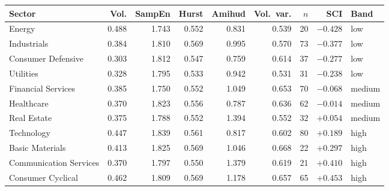 \begin{tabular}{lrrrrrrrl}
\toprule
Sector & Vol. & SampEn & Hurst & Amihud & Vol.\ var. & $n$ & SCI & Band \\
\midrule
Energy & 0.488 & 1.743 & 0.552 & 0.831 & 0.539 & 20 & $-0.428$ & low \\
Industrials & 0.384 & 1.810 & 0.569 & 0.995 & 0.570 & 73 & $-0.377$ & low \\
Consumer Defensive & 0.303 & 1.812 & 0.547 & 0.759 & 0.614 & 37 & $-0.277$ & low \\
Utilities & 0.328 & 1.795 & 0.533 & 0.942 & 0.531 & 31 & $-0.238$ & low \\
Financial Services & 0.385 & 1.750 & 0.552 & 1.049 & 0.653 & 70 & $-0.068$ & medium \\
Healthcare & 0.370 & 1.823 & 0.556 & 0.787 & 0.636 & 62 & $-0.014$ & medium \\
Real Estate & 0.375 & 1.788 & 0.552 & 1.394 & 0.552 & 32 & $+0.054$ & medium \\
Technology & 0.447 & 1.839 & 0.561 & 0.817 & 0.602 & 80 & $+0.189$ & high \\
Basic Materials & 0.413 & 1.825 & 0.569 & 1.046 & 0.668 & 22 & $+0.297$ & high \\
Communication Services & 0.370 & 1.797 & 0.550 & 1.379 & 0.619 & 21 & $+0.410$ & high \\
Consumer Cyclical & 0.462 & 1.809 & 0.569 & 1.178 & 0.657 & 65 & $+0.453$ & high \\
\bottomrule
\end{tabular}
